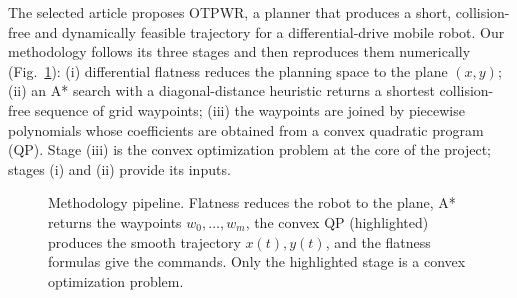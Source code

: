 
The selected article proposes OTPWR, a planner that produces a short, collision-free and dynamically feasible trajectory for a differential-drive mobile robot. Our methodology follows its three stages and then reproduces them numerically (Fig.~\ref{fig:pipeline}):
(i) differential flatness reduces the planning space to the plane $(x,y)$;
(ii) an A* search with a diagonal-distance heuristic returns a shortest collision-free sequence of grid waypoints;
(iii) the waypoints are joined by piecewise polynomials whose coefficients are obtained from a convex quadratic program (QP).
Stage (iii) is the convex optimization problem at the core of the project; stages (i) and (ii) provide its inputs.

\begin{figure}[htbp]
\centering
{}
\caption{Methodology pipeline. Flatness reduces the robot to the plane, A* returns the waypoints $w_0,\dots,w_m$, the convex QP (highlighted) produces the smooth trajectory $x(t), y(t)$, and the flatness formulas give the commands. Only the highlighted stage is a convex optimization problem.}
\label{fig:pipeline}
\end{figure}

